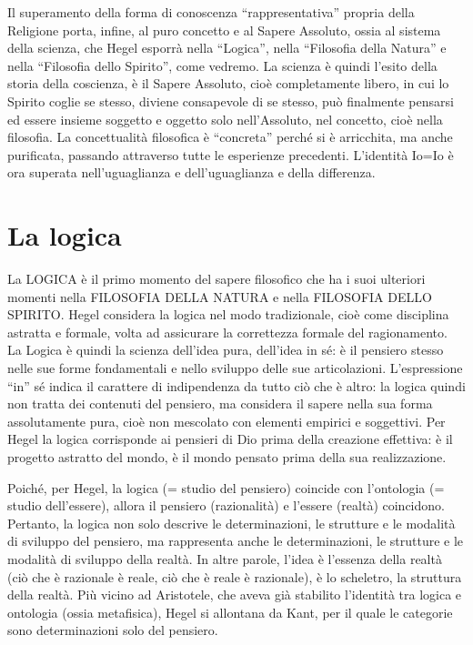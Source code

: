 \documentclass[a4paper,12pt,oneside,openany]{book}%
\begin{document}
Il superamento della forma di conoscenza “rappresentativa” propria della Religione porta, infine, al puro concetto e al Sapere Assoluto, ossia al sistema della scienza, che Hegel esporrà nella “Logica”, nella “Filosofia della Natura” e nella “Filosofia dello Spirito”, come vedremo. La scienza è quindi l’esito della storia della coscienza, è il Sapere Assoluto, cioè completamente libero, in cui lo Spirito coglie se stesso, diviene consapevole di se stesso, può finalmente pensarsi ed essere insieme soggetto e oggetto solo nell’Assoluto, nel concetto, cioè nella filosofia. La concettualità filosofica è “concreta” perché si è arricchita, ma anche purificata, passando attraverso tutte le esperienze precedenti. L’identità Io=Io è ora superata nell’uguaglianza e dell’uguaglianza e della differenza.

\newpage
	
\section*{La logica}	
	
La LOGICA è il primo momento del sapere filosofico che ha i suoi ulteriori momenti nella FILOSOFIA  DELLA NATURA e nella FILOSOFIA DELLO SPIRITO. Hegel considera la logica nel modo tradizionale, cioè come disciplina astratta e formale, volta ad assicurare la correttezza formale del ragionamento. La Logica è quindi la scienza dell’idea pura, dell’idea in sé: è il pensiero stesso nelle sue forme fondamentali e nello sviluppo delle sue articolazioni. L’espressione “in” sé indica il carattere di indipendenza da tutto ciò che è altro:  la logica quindi non tratta dei contenuti del pensiero, ma considera il sapere nella sua forma assolutamente pura, cioè non mescolato con elementi empirici e soggettivi. Per Hegel la logica corrisponde ai pensieri di Dio prima della creazione effettiva: è il progetto astratto del mondo, è il mondo pensato prima della sua realizzazione.

Poiché, per Hegel, la logica (= studio del pensiero) coincide con l’ontologia (= studio dell’essere), allora il pensiero (razionalità) e l’essere (realtà) coincidono. Pertanto, la logica non solo descrive le determinazioni, le strutture e le modalità di sviluppo del pensiero, ma rappresenta anche le determinazioni, le strutture e le modalità di sviluppo della realtà. In altre parole, l’idea è l’essenza della realtà (ciò che è razionale è reale, ciò che è reale è razionale), è lo scheletro, la struttura della realtà. Più vicino ad Aristotele, che aveva già stabilito l’identità tra logica e ontologia (ossia metafisica), Hegel si allontana da Kant, per il quale le categorie sono determinazioni solo del pensiero.
\end{document}
